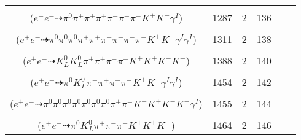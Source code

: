 \documentclass[landscape]{article}
\newcounter{rownumbers}
\newcommand\rn{\stepcounter{rownumbers}\arabic{rownumbers}}
\newcommand{\EOL}{\\} %
\newcommand{\topoTags}[1]{#1} %
\begin{document}
\begin{longtable}{clcccc}
\rn & \makecell[l]{ $ 
e^{+} e^{-} \rightarrow \pi^{+} \pi^{-} \pi^{-} \pi^{-} \rho^{+} \bar{K}^{*} K^{+} \gamma^{I} ,
\rho^{+} \rightarrow \pi^{0} \pi^{+} ,
\bar{K}^{*} \rightarrow \pi^{+} K^{-} 
$ \\ ($
e^{+} e^{-} \dashrightarrow \pi^{0} \pi^{+} \pi^{+} \pi^{+} \pi^{-} \pi^{-} \pi^{-} K^{+} K^{-} \gamma^{I} 
$) } & \topoTags{1287 & }2 & 136 \EOL

\rn & \makecell[l]{ $ 
e^{+} e^{-} \rightarrow \pi^{0} \pi^{0} \pi^{+} \pi^{+} \pi^{+} \pi^{-} \pi^{-} \rho^{-} K^{+} K^{-} \gamma^{I} \gamma^{I} ,
\rho^{-} \rightarrow \pi^{0} \pi^{-} 
$ \\ ($
e^{+} e^{-} \dashrightarrow \pi^{0} \pi^{0} \pi^{0} \pi^{+} \pi^{+} \pi^{+} \pi^{-} \pi^{-} \pi^{-} K^{+} K^{-} \gamma^{I} \gamma^{I} 
$) } & \topoTags{1311 & }2 & 138 \EOL

\rn & \makecell[l]{ $ 
e^{+} e^{-} \rightarrow \pi^{-} \bar{K}^{*} K^{+} K^{+} K^{-} K^{*+} K^{*-} ,
\bar{K}^{*} \rightarrow \pi^{+} K^{-} ,
K^{*+} \rightarrow \pi^{+} K^{0} ,
K^{*-} \rightarrow \pi^{-} \bar{K}^{0} ,
K^{0} \rightarrow K_{L}^{0} ,
\bar{K}^{0} \rightarrow K_{L}^{0} 
$ \\ ($
e^{+} e^{-} \dashrightarrow K_{L}^{0} K_{L}^{0} \pi^{+} \pi^{+} \pi^{-} \pi^{-} K^{+} K^{+} K^{-} K^{-} 
$) } & \topoTags{1388 & }2 & 140 \EOL

\rn & \makecell[l]{ $ 
e^{+} e^{-} \rightarrow \pi^{0} \rho^{0} K^{0} \bar{K}^{0} K^{+} K^{-} \gamma^{I} \gamma^{I} ,
\rho^{0} \rightarrow \pi^{+} \pi^{-} ,
K^{0} \rightarrow K_{S}^{0} ,
\bar{K}^{0} \rightarrow K_{L}^{0} ,
K_{S}^{0} \rightarrow \pi^{+} \pi^{-} 
$ \\ ($
e^{+} e^{-} \dashrightarrow \pi^{0} K_{L}^{0} \pi^{+} \pi^{+} \pi^{-} \pi^{-} K^{+} K^{-} \gamma^{I} \gamma^{I} 
$) } & \topoTags{1454 & }2 & 142 \EOL

\rn & \makecell[l]{ $ 
e^{+} e^{-} \rightarrow \pi^{0} \pi^{0} \pi^{0} \pi^{+} \rho^{-} \eta K^{+} K^{-} \phi \gamma^{I} ,
\rho^{-} \rightarrow \pi^{0} \pi^{-} ,
\eta \rightarrow \pi^{0} \pi^{0} \pi^{0} ,
\phi \rightarrow K^{+} K^{-} 
$ \\ ($
e^{+} e^{-} \dashrightarrow \pi^{0} \pi^{0} \pi^{0} \pi^{0} \pi^{0} \pi^{0} \pi^{0} \pi^{+} \pi^{-} K^{+} K^{+} K^{-} K^{-} \gamma^{I} 
$) } & \topoTags{1455 & }2 & 144 \EOL

\rn & \makecell[l]{ $ 
e^{+} e^{-} \rightarrow \pi^{+} \pi^{-} \rho^{-} \bar{K}^{0} K^{+} \phi ,
\rho^{-} \rightarrow \pi^{0} \pi^{-} ,
\bar{K}^{0} \rightarrow K_{L}^{0} ,
\phi \rightarrow K^{+} K^{-} 
$ \\ ($
e^{+} e^{-} \dashrightarrow \pi^{0} K_{L}^{0} \pi^{+} \pi^{-} \pi^{-} K^{+} K^{+} K^{-} 
$) } & \topoTags{1464 & }2 & 146 \EOL


\end{longtable}
\end{document}
